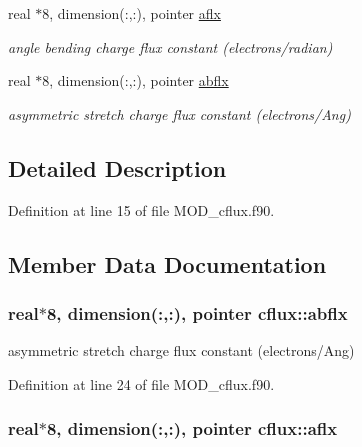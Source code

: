 \begin{DoxyCompactItemize}
real $\ast$8, dimension(\-:,\-:), pointer \hyperlink{classcflux_a6997ebe51cb41e002ad0877c510457ce}{aflx}
\begin{DoxyCompactList}\small\item\em angle bending charge flux constant (electrons/radian) \end{DoxyCompactList}\item 
real $\ast$8, dimension(\-:,\-:), pointer \hyperlink{classcflux_a8a56b19211174f88bceeb2251d03fdc1}{abflx}
\begin{DoxyCompactList}\small\item\em asymmetric stretch charge flux constant (electrons/\-Ang) \end{DoxyCompactList}\end{DoxyCompactItemize}


\subsection{Detailed Description}


Definition at line 15 of file M\-O\-D\-\_\-cflux.\-f90.



\subsection{Member Data Documentation}
\hypertarget{classcflux_a8a56b19211174f88bceeb2251d03fdc1}{
\subsubsection[{abflx}]{\setlength{\rightskip}{0pt plus 5cm}real$\ast$8, dimension(\-:,\-:), pointer cflux\-::abflx}}\label{classcflux_a8a56b19211174f88bceeb2251d03fdc1}


asymmetric stretch charge flux constant (electrons/\-Ang) 



Definition at line 24 of file M\-O\-D\-\_\-cflux.\-f90.

\hypertarget{classcflux_a6997ebe51cb41e002ad0877c510457ce}{
\subsubsection[{aflx}]{\setlength{\rightskip}{0pt plus 5cm}real$\ast$8, dimension(\-:,\-:), pointer cflux\-::aflx}}\label{classcflux_a6997ebe51cb41e002ad0877c510457ce}


